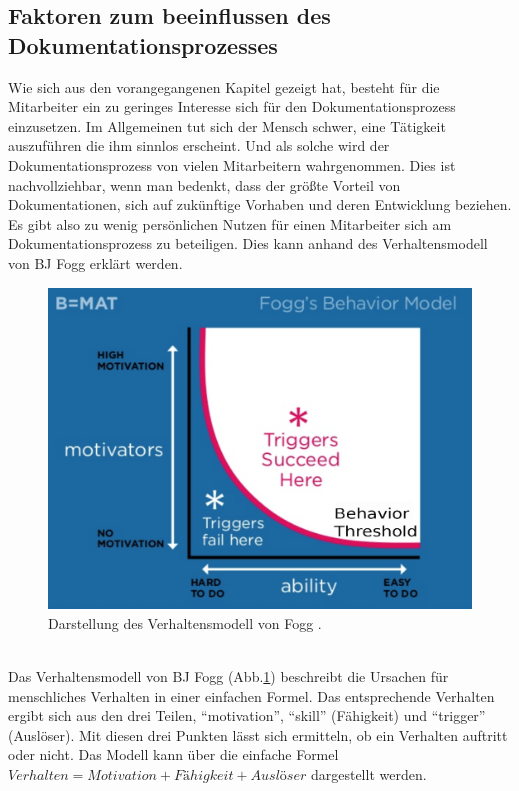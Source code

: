 \documentclass[a4paper,12pt,twoside]{scrartcl}
\begin{document}
\subsection{Faktoren zum beeinflussen des Dokumentationsprozesses}
\label{Dokunutzen}
Wie sich aus den vorangegangenen Kapitel gezeigt hat, besteht für die Mitarbeiter ein zu geringes Interesse sich für den Dokumentationsprozess einzusetzen. Im Allgemeinen tut sich der Mensch schwer, eine Tätigkeit auszuführen die ihm sinnlos erscheint. Und als solche wird der Dokumentationsprozess von vielen Mitarbeitern wahrgenommen. Dies ist nachvollziehbar, wenn man bedenkt, dass der größte Vorteil von Dokumentationen, sich auf zukünftige Vorhaben und deren Entwicklung beziehen. Es gibt also zu wenig persönlichen Nutzen für einen Mitarbeiter sich am Dokumentationsprozess zu beteiligen. Dies kann anhand des Verhaltensmodell von BJ Fogg erklärt werden.
\\
\begin{figure}[h!]
\begin{center}
\includegraphics[scale = 0.4]{Bilder/Verhaltensmodell.eps}
\caption{Darstellung des Verhaltensmodell von Fogg \cite{Verhaltensmodell2018}.}
\label{VerhaltensmodellBild}
\end{center}
\end{figure}
\\
Das Verhaltensmodell von BJ Fogg (Abb.\ref{VerhaltensmodellBild}) beschreibt die Ursachen für menschliches Verhalten in einer einfachen Formel. Das entsprechende Verhalten ergibt sich aus den drei Teilen, \enquote{motivation}, \enquote{skill} (Fähigkeit) und \enquote{trigger} (Auslöser). Mit diesen drei Punkten lässt sich ermitteln, ob ein Verhalten auftritt oder nicht. Das Modell kann über die einfache Formel \( Verhalten = Motivation + Fähigkeit + Auslöser \) dargestellt werden.
\end{document}
